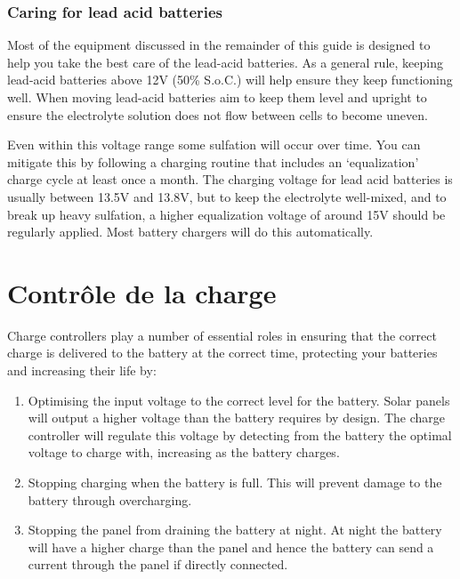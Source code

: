 \documentclass{article}
\theoremstyle{definition}
\theoremstyle{definition}
\theoremstyle{remark}
\begin{document}

    \subsubsection{Caring for lead acid batteries} %
    \label{ssub:caring_for_lead_acid_batteries}

      Most of the equipment discussed in the remainder of this guide is designed to help you take the best care of the lead-acid batteries. As a general rule, keeping lead-acid batteries above 12V (50\% S.o.C.) will help ensure they keep functioning well. When moving lead-acid batteries aim to keep them level and upright to ensure the electrolyte solution does not flow between cells to become uneven.

      Even within this voltage range some sulfation will occur over time. You can mitigate this by following a charging routine that includes an ‘equalization’ charge cycle at least once a month. The charging voltage for lead acid batteries is usually between 13.5V and 13.8V, but to keep the electrolyte well-mixed, and to break up heavy sulfation, a higher equalization voltage of around 15V should be regularly applied. Most battery chargers will do this automatically. 





{\color{blue}\section{Contrôle de la charge}} %
\label{sec:controle_de_la_charge}

  Charge controllers play a number of essential roles in ensuring that the correct charge is delivered to the battery at the correct time, protecting your batteries and increasing their life by: 

  \begin{enumerate}
    \item Optimising the input voltage to the correct level for the battery. Solar panels will output a higher voltage than the battery requires by design. The charge controller will regulate this voltage by detecting from the battery the optimal voltage to charge with, increasing as the battery charges. 
    \item Stopping charging when the battery is full. This will prevent damage to the battery through overcharging. 
    \item Stopping the panel from draining the battery at night. At night the battery will have a higher charge than the panel and hence the battery can send a current through the panel if directly connected. 
  \end{enumerate}
\end{document}
